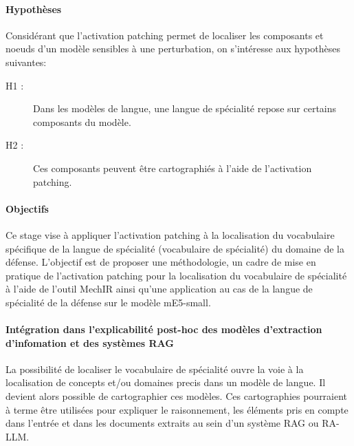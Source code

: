 \paragraph{Hypothèses} Considérant que l'activation patching permet de localiser les composants et noeuds d'un modèle sensibles à une perturbation, on s'intéresse aux hypothèses suivantes:

\begin{description}
    \item[H1 : ] Dans les modèles de langue, une langue de spécialité repose sur certains composants du modèle.
    \item[H2 : ] Ces composants peuvent être cartographiés à l'aide de l'activation patching.
\end{description}

\paragraph{Objectifs} Ce stage vise à appliquer l'activation patching à la localisation du vocabulaire spécifique de la langue de spécialité (vocabulaire de spécialité) du domaine de la défense. L'objectif est de proposer une méthodologie, un cadre de mise en pratique de l'activation patching pour la localisation du vocabulaire de spécialité à l'aide de l'outil MechIR ainsi qu'une application au cas de la langue de spécialité de la défense sur le modèle mE5-small.

\paragraph{Intégration dans l'explicabilité post-hoc des modèles d'extraction d'infomation et des systèmes RAG} La possibilité de localiser le vocabulaire de spécialité ouvre la voie à la localisation de concepts et/ou domaines precis dans un modèle de langue. Il devient alors possible de cartographier ces modèles. Ces cartographies pourraient à terme être utilisées pour expliquer le raisonnement, les éléments pris en compte dans l'entrée et dans les documents extraits au sein d'un système RAG ou RA-LLM. 
